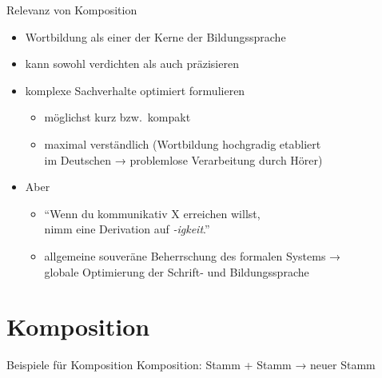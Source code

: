 \begin{frame}
  {Relevanz von Komposition}
  \onslide<+->
  \begin{itemize}[<+->]
    \item Wortbildung als einer der Kerne der Bildungssprache
    \item kann sowohl \alert{verdichten} als auch \alert{präzisieren} 
    \Halbzeile
    \item komplexe Sachverhalte \alert{optimiert} formulieren
      \begin{itemize}[<+->]
        \item möglichst kurz bzw.\ kompakt
        \item maximal verständlich (Wortbildung hochgradig etabliert\\
          im Deutschen → problemlose Verarbeitung durch Hörer)
      \end{itemize}
      \Halbzeile
    \item Aber 
      \Halbzeile
      \begin{itemize}[<+->]
        \item "`Wenn du kommunikativ X erreichen willst,\\
          nimm eine Derivation auf \textit{-igkeit}."' \onslide<+-> 
        \item \alert{allgemeine souveräne Beherrschung des formalen Systems →\\
          globale Optimierung der Schrift- und Bildungssprache}
      \end{itemize}
  \end{itemize}
\end{frame}

\section{Komposition}

\begin{frame}
  {Beispiele für Komposition}
  \onslide<+->
  Komposition: \alert{Stamm + Stamm → neuer Stamm}
  \Halbzeile
  \onslide<+->
  \begin{exe}
    \ex
    \begin{xlist}
      \onslide<+->
      \onslide<+->
      \onslide<+->
      \onslide<+->
      \onslide<+->
      \onslide<+->
      \onslide<+->
      \onslide<+->
    \end{xlist}
  \end{exe}
\end{frame}

